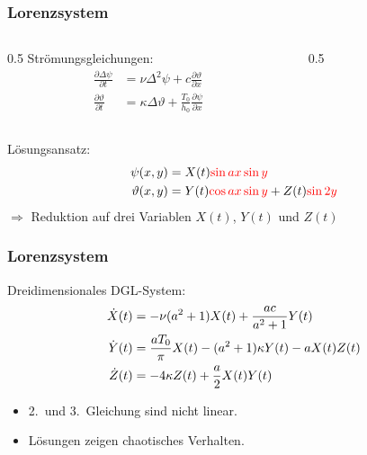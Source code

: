 \begin{frame}
\frametitle{Lorenzsystem}
\begin{columns}
\begin{column}{0.5\hsize}
Strömungsgleichungen:
\begin{align*}
\frac{\partial \Delta \psi}{\partial t}
&=
\nu \Delta^2 \psi + c\frac{\partial \vartheta}{\partial x}
\\
\frac{\partial \vartheta}{\partial t}
&=
\kappa\Delta \vartheta
+
\frac{T_0}{h_0}\frac{\partial \psi}{\partial x}
\end{align*}
\end{column}
\def\t{2.5}
\begin{column}{0.5\hsize}
\begin{center}
\end{center}
\end{column}
\end{columns}
Lösungsansatz:
\begin{align*}
\psi(x,y)
&=
X(t)
{\color{red}\sin ax \sin y}
\\
\vartheta(x,y)
&=
Y(t)
{\color{red}
\cos ax\sin y
}
+
Z(t)
{\color{red}
\sin 2y
}
\end{align*}
$\Rightarrow$ Reduktion auf drei Variablen $X(t)$, $Y(t)$ und $Z(t)$
\end{frame}

\begin{frame}
\frametitle{Lorenzsystem}
Dreidimensionales DGL-System:
\begin{equation}
\begin{aligned}
\dot X(t)
&=
-\nu(a^2+1)X(t)
+\frac{ac}{a^2+1}Y(t)
\\
\dot Y(t)
&=
\frac{aT_0}{\pi}X(t)
-(a^2+1)\kappa Y(t)
-aX(t)Z(t)
\\
\dot Z(t)
&=
-4\kappa Z(t)
+\frac{a}{2}X(t)Y(t)
\end{aligned}
\notag
\end{equation}
\begin{itemize}
\item
2.~und 3.~Gleichung sind nicht linear.
\item
Lösungen zeigen chaotisches Verhalten.
\end{itemize}
\end{frame}


